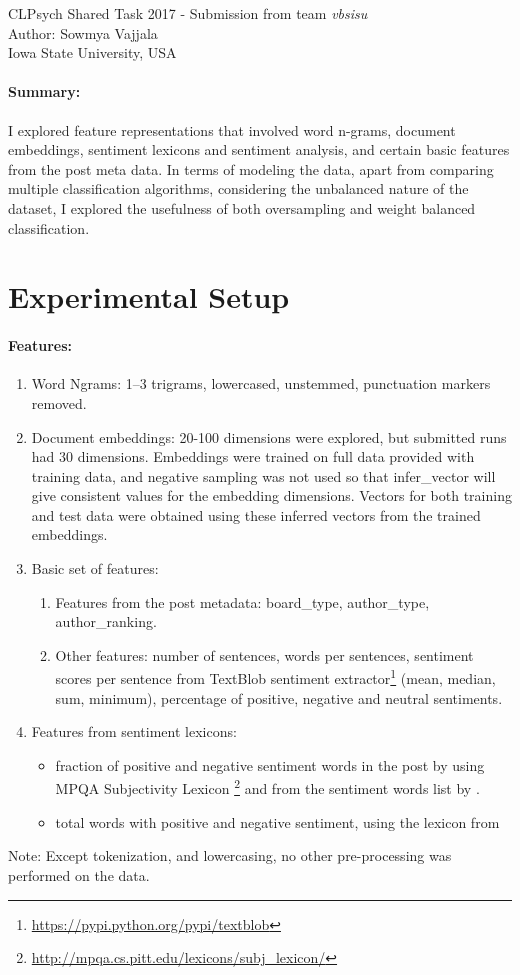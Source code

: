 \documentclass{article}
\begin{document}
CLPsych Shared Task 2017 - Submission from team \textit{vbsisu}
\\  Author: Sowmya Vajjala
\\ Iowa State University, USA

\paragraph{Summary: } I explored feature representations that involved word n-grams, document embeddings, sentiment lexicons and sentiment analysis, and certain basic features from the post meta data. In terms of modeling the data, apart from comparing multiple classification algorithms, considering the unbalanced nature of the dataset, I explored the usefulness of both oversampling and weight balanced classification.

\section{Experimental Setup}
\paragraph{Features: }
\begin{enumerate}
\item Word Ngrams: 1--3 trigrams, lowercased, unstemmed, punctuation markers removed.
\item Document embeddings: 20-100 dimensions were explored, but submitted runs had 30 dimensions.  Embeddings were trained on full data provided with training data, and negative sampling was not used so that infer\_vector will give consistent values for the embedding dimensions.  Vectors for both training and test data were obtained using these inferred vectors from the trained embeddings. 
\item Basic set of features:
\begin{enumerate}
\item Features from the post metadata: board\_type, author\_type, author\_ranking.
\item Other features: number of sentences, words per sentences, sentiment scores per sentence from TextBlob sentiment extractor\footnote{\url{https://pypi.python.org/pypi/textblob}} (mean, median, sum, minimum), percentage of positive, negative and neutral sentiments. 
\end{enumerate}
\item Features from sentiment lexicons: 
\begin{itemize}
\item fraction of positive and negative sentiment words in the post by using MPQA Subjectivity Lexicon \cite{Wilson.Wiebe.ea-05}\footnote{\url{http://mpqa.cs.pitt.edu/lexicons/subj_lexicon/}} and from the sentiment words list by \cite{Liu.Hu.ea-05}. 
\item total words with positive and negative sentiment, using the lexicon from \cite{Hamilton.Clark.ea-16}
\end{itemize}
\end{enumerate}
Note: Except tokenization, and lowercasing, no other pre-processing was performed on the data.
\end{document}
